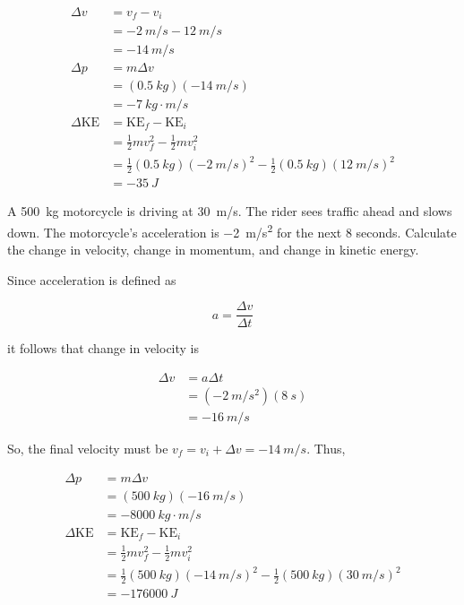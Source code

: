 \documentclass[../main-physics-problems.tex]{subfiles}
\begin{document}
\begin{questions}
\begin{solution}
\begin{align*}
    \Delta v &= v_f - v_i \\[1ex]
    &= \SI{-2}{m/s} - \SI{12}{m/s} \\[1ex]
    &= \boxed{\SI{-14}{m/s}} \\[2ex]
    \Delta p &= m \Delta v \\[1ex]
    &= (\SI{0.5}{kg})(\SI{-14}{m/s}) \\[1ex]
    &= \boxed{\SI{-7}{kg\cdot m/s}} \\[2ex]
    \Delta \mathrm{KE} &= \mathrm{KE}_f - \mathrm{KE}_i \\[1ex]
    &= \frac{1}{2}m v_f^2 - \frac{1}{2}mv_i^2 \\[1ex]
    &= \frac{1}{2}(\SI{0.5}{kg})(\SI{-2}{m/s})^2 - \frac{1}{2}(\SI{0.5}{kg}) (\SI{12}{m/s})^2 \\[1ex]
    &= \boxed{\SI{-35}{J}}
\end{align*}
\end{solution}

\ifprintanswers
    \clearpage
\fi

\question
A \SI{500}{kg} motorcycle is driving at \SI{30}{m/s}. The rider sees traffic ahead and slows down. The motorcycle's acceleration is \SI{-2}{m/s^2} for the next 8 seconds. Calculate the change in velocity, change in momentum, and change in kinetic energy. 


\begin{solution}
Since acceleration is defined as

\begin{equation*}
    a = \frac{\Delta v}{\Delta t}
\end{equation*}

it follows that change in velocity is

\vspace{-1em}
\begin{align*}
    \Delta v &= a \Delta t \\[1ex]
    &= (\SI{-2}{m/s^2})(\SI{8}{s}) \\[1ex]
    &= \boxed{\SI{-16}{m/s}}
\end{align*}
\vspace{-1em}

So, the final velocity must be $v_f = v_i + \Delta v = \SI{-14}{m/s}$. Thus,

\begin{align*}
    \Delta p &= m \Delta v \\[1ex]
    &= (\SI{500}{kg})(\SI{-16}{m/s}) \\[1ex]
    &= \boxed{\SI{-8000}{kg\cdot m/s}} \\[2ex]
    \Delta \mathrm{KE} &= \mathrm{KE}_f - \mathrm{KE}_i \\[1ex]
    &= \frac{1}{2}m v_f^2 - \frac{1}{2}mv_i^2 \\[1ex]
    &= \frac{1}{2}(\SI{500}{kg})(\SI{-14}{m/s})^2 - \frac{1}{2}(\SI{500}{kg}) (\SI{30}{m/s})^2 \\[1ex]
    &= \boxed{\SI{-176000}{J}}
\end{align*}
\end{solution}




\end{questions}
\end{document}
